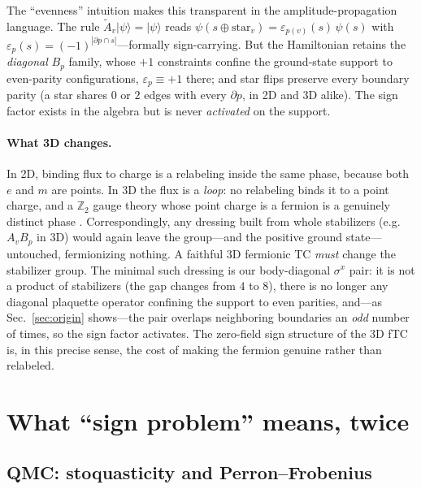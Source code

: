 \documentclass[11pt]{article}
\newcommand{\Bp}{B_p}
\newcommand{\ket}[1]{|#1\rangle}
\newcommand{\sx}{\sigma^x}
\begin{document}
The ``evenness'' intuition makes this transparent in the amplitude-propagation
language. The rule $\tilde A_v\ket\psi=\ket\psi$ reads
$\psi(s\oplus\mathrm{star}_{v})=\varepsilon_{p(v)}(s)\,\psi(s)$ with
$\varepsilon_p(s)=(-1)^{|\partial p\cap s|}$---formally sign-carrying. But the
Hamiltonian retains the \emph{diagonal} $\Bp$ family, whose $+1$ constraints
confine the ground-state support to even-parity configurations,
$\varepsilon_p\equiv+1$ there; and star flips preserve every boundary parity
(a star shares $0$ or $2$ edges with every $\partial p$, in 2D and 3D alike).
The sign factor exists in the algebra but is never \emph{activated} on the
support.

\paragraph{What 3D changes.}
In 2D, binding flux to charge is a relabeling inside the same phase, because
both $e$ and $m$ are points. In 3D the flux is a \emph{loop}: no relabeling
binds it to a point charge, and a $\mathbb{Z}_2$ gauge theory whose point
charge is a fermion is a genuinely distinct phase
\cite{LevinWen2003,WangLevin2014,ChenKapustin2019}. Correspondingly, any
dressing built from whole stabilizers (e.g.\ $A_v\Bp$ in 3D) would again leave
the group---and the positive ground state---untouched, fermionizing nothing.
A faithful 3D fermionic TC \emph{must} change the stabilizer group. The
minimal such dressing is our body-diagonal $\sx$ pair: it is not a product of
stabilizers (the gap changes from $4$ to $8$), there is no longer any diagonal
plaquette operator confining the support to even parities, and---as
Sec.~\ref{sec:origin} shows---the pair overlaps neighboring boundaries an
\emph{odd} number of times, so the sign factor activates. The zero-field sign
structure of the 3D fTC is, in this precise sense, the cost of making the
fermion genuine rather than relabeled.

\section{What ``sign problem'' means, twice}
\label{sec:defs}

\subsection{QMC: stoquasticity and Perron--Frobenius}
\end{document}
